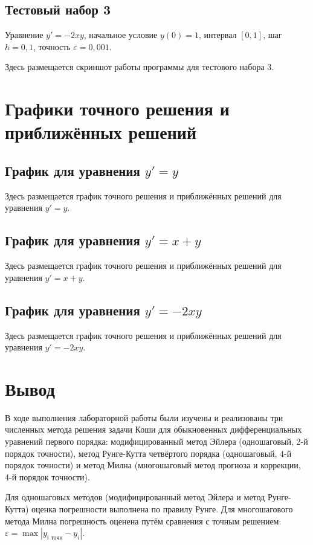 \subsection{Тестовый набор 3}

Уравнение $y' = -2xy$, начальное условие $y(0) = 1$, интервал $[0, 1]$, шаг $h = 0{,}1$, точность $\varepsilon = 0{,}001$.

Здесь размещается скриншот работы программы для тестового набора 3.

\section{Графики точного решения и приближённых решений}

\subsection{График для уравнения $y' = y$}

Здесь размещается график точного решения и приближённых решений для уравнения $y' = y$.

\subsection{График для уравнения $y' = x + y$}

Здесь размещается график точного решения и приближённых решений для уравнения $y' = x + y$.

\subsection{График для уравнения $y' = -2xy$}

Здесь размещается график точного решения и приближённых решений для уравнения $y' = -2xy$.

\section{Вывод}

В ходе выполнения лабораторной работы были изучены и реализованы три численных метода решения задачи Коши для обыкновенных дифференциальных уравнений первого порядка: модифицированный метод Эйлера (одношаговый, 2-й порядок точности), метод Рунге-Кутта четвёртого порядка (одношаговый, 4-й порядок точности) и метод Милна (многошаговый метод прогноза и коррекции, 4-й порядок точности).

Для одношаговых методов (модифицированный метод Эйлера и метод Рунге-Кутта) оценка погрешности выполнена по правилу Рунге. Для многошагового метода Милна погрешность оценена путём сравнения с точным решением: $\varepsilon = \max |y_{i \text{ точн}} - y_i|$.

